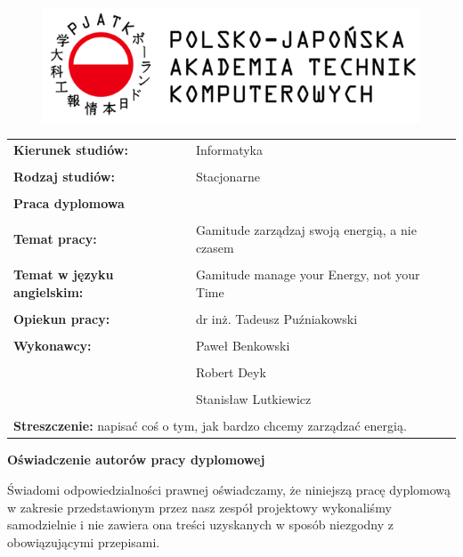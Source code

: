 \documentclass[a4paper,11pt]{report}
\begin{document}
\let\cleardoublepage\clearpage
\begin{figure}[ht]
\centering
\includegraphics{pjatk}
\end{figure}
\vspace{1cm}
\begin{tabular}{ p{7cm} p{7cm} }
\textbf{Kierunek studiów:} & Informatyka \\
 & \\
\textbf{Rodzaj studiów:} & Stacjonarne \\
 & \\
\multicolumn{2}{p{13cm}}{\centering\textbf{\huge Praca dyplomowa}}\\
 & \\
\textbf{Temat pracy:} & Gamitude zarządzaj swoją energią, a nie czasem \\
 & \\
\textbf{Temat w języku angielskim:} & Gamitude manage your Energy, not your Time \\
 & \\
\textbf{Opiekun pracy:} & dr inż. Tadeusz Puźniakowski \\
 & \\
\textbf{Wykonawcy:} & Paweł Benkowski \\
 & \\
 & Robert Deyk \\
 & \\
 & Stanisław Lutkiewicz \\
 & \\
\multicolumn{2}{p{13cm}}{\textbf{Streszczenie:} napisać coś o tym, jak bardzo chcemy zarządzać energią.}\\
\end{tabular}
\newpage
\begin{center}
	\textbf{Oświadczenie autorów pracy dyplomowej}\\
\end{center}
Świadomi odpowiedzialności prawnej oświadczamy, że niniejszą pracę dyplomową w zakresie przedstawionym przez nasz zespół projektowy wykonaliśmy samodzielnie i nie zawiera ona treści uzyskanych w sposób niezgodny z obowiązującymi przepisami.\\
\end{document}
